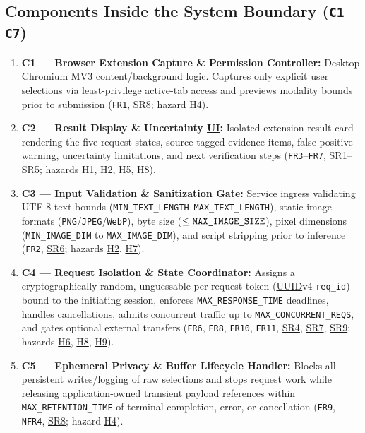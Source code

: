 \documentclass[11pt]{article}
\newcommand{\MaxResponseTime}{\texttt{MAX\_\allowbreak{}RESPONSE\_\allowbreak{}TIME}}
\newcommand{\MaxRetentionTime}{\texttt{MAX\_\allowbreak{}RETENTION\_\allowbreak{}TIME}}
\newcommand{\MinTextLength}{\texttt{MIN\_\allowbreak{}TEXT\_\allowbreak{}LENGTH}}
\newcommand{\MinImageDim}{\texttt{MIN\_\allowbreak{}IMAGE\_\allowbreak{}DIM}}
\newcommand{\MaxTextLength}{\texttt{MAX\_\allowbreak{}TEXT\_\allowbreak{}LENGTH}}
\newcommand{\MaxImageSize}{\texttt{MAX\_\allowbreak{}IMAGE\_\allowbreak{}SIZE}}
\newcommand{\MaxImageDim}{\texttt{MAX\_\allowbreak{}IMAGE\_\allowbreak{}DIM}}
\newcommand{\MaxConcurrentReqs}{\texttt{MAX\_\allowbreak{}CONCURRENT\_\allowbreak{}REQS}}
\newcommand{\MVThree}{\hyperlink{ha-acr-mv3}{MV3}}
\newcommand{\UI}{\hyperlink{ha-acr-ui}{UI}}
\newcommand{\UUID}{\hyperlink{ha-acr-uuid}{UUID}}
\begin{document}
\subsection{Components Inside the System Boundary (\texttt{C1}--\texttt{C7})}
\begin{enumerate}[leftmargin=*]
    \item {}\label{comp:C1}\textbf{C1 --- Browser Extension Capture \& Permission Controller:} Desktop Chromium \MVThree{} content/background logic. Captures only explicit user selections via least-privilege active-tab access and previews modality bounds prior to submission (\texttt{FR1}, \hyperref[SR8]{SR8}; hazard \hyperref[haz:H4]{H4}).
    \item {}\label{comp:C2}\textbf{C2 --- Result Display \& Uncertainty \UI{}:} Isolated extension result card rendering the five request states, source-tagged evidence items, false-positive warning, uncertainty limitations, and next verification steps (\texttt{FR3}--\texttt{FR7}, \hyperref[SR1]{SR1}--\hyperref[SR5]{SR5}; hazards \hyperref[haz:H1]{H1}, \hyperref[haz:H2]{H2}, \hyperref[haz:H5]{H5}, \hyperref[haz:H8]{H8}).
    \item {}\label{comp:C3}\textbf{C3 --- Input Validation \& Sanitization Gate:} Service ingress validating UTF-8 text bounds (\MinTextLength{}--\MaxTextLength{}), static image formats (\texttt{PNG}/\texttt{JPEG}/\texttt{WebP}), byte size ($\le \MaxImageSize{}$), pixel dimensions (\MinImageDim{} to \MaxImageDim{}), and script stripping prior to inference (\texttt{FR2}, \hyperref[SR6]{SR6}; hazards \hyperref[haz:H2]{H2}, \hyperref[haz:H7]{H7}).
    \item {}\label{comp:C4}\textbf{C4 --- Request Isolation \& State Coordinator:} Assigns a cryptographically random, unguessable per-request token (\UUID{}v4 \texttt{req\_\allowbreak{}id}) bound to the initiating session, enforces \MaxResponseTime{} deadlines, handles cancellations, admits concurrent traffic up to \MaxConcurrentReqs{}, and gates optional external transfers (\texttt{FR6}, \texttt{FR8}, \texttt{FR10}, \texttt{FR11}, \hyperref[SR4]{SR4}, \hyperref[SR7]{SR7}, \hyperref[SR9]{SR9}; hazards \hyperref[haz:H6]{H6}, \hyperref[haz:H8]{H8}, \hyperref[haz:H9]{H9}).
    \item {}\label{comp:C5}\textbf{C5 --- Ephemeral Privacy \& Buffer Lifecycle Handler:} Blocks all persistent writes/logging of raw selections and stops request work while releasing application-owned transient payload references within \MaxRetentionTime{} of terminal completion, error, or cancellation (\texttt{FR9}, \texttt{NFR4}, \hyperref[SR8]{SR8}; hazard \hyperref[haz:H4]{H4}).

\end{enumerate}
\end{document}
